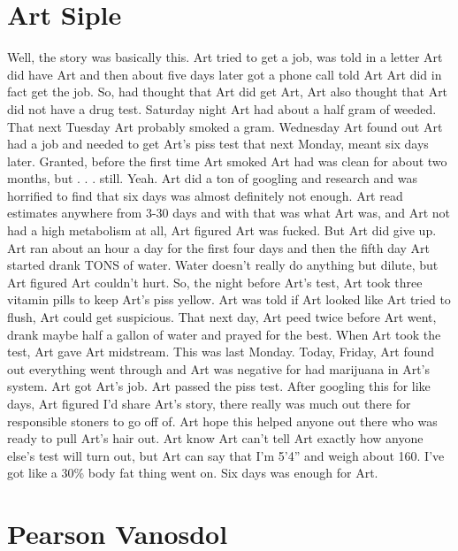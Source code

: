\documentclass[12pt]{book}
\begin{document}
\chapter{Art Siple}

Well, the story was basically this. Art tried to get a job, was told in a letter Art did have Art and then about five days later got a phone call told Art Art did in fact get the job. So, had thought that Art did get Art, Art also thought that Art did not have a drug test. Saturday night Art had about a half gram of weeded. That next Tuesday Art probably smoked a gram. Wednesday Art found out Art had a job and needed to get Art's piss test that next Monday, meant six days later. Granted, before the first time Art smoked Art had was clean for about two months, but . . .  still. Yeah. Art did a ton of googling and research and was horrified to find that six days was almost definitely not enough. Art read estimates anywhere from 3-30 days and with that was what Art was, and Art not had a high metabolism at all, Art figured Art was fucked. But Art did give up. Art ran about an hour a day for the first four days and then the fifth day Art started drank TONS of water. Water doesn't really do anything but dilute, but Art figured Art couldn't hurt. So, the night before Art's test, Art took three vitamin pills to keep Art's piss yellow. Art was told if Art looked like Art tried to flush, Art could get suspicious. That next day, Art peed twice before Art went, drank maybe half a gallon of water and prayed for the best. When Art took the test, Art gave Art midstream. This was last Monday. Today, Friday, Art found out everything went through and Art was negative for had marijuana in Art's system. Art got Art's job. Art passed the piss test. After googling this for like days, Art figured I'd share Art's story, there really was much out there for responsible stoners to go off of. Art hope this helped anyone out there who was ready to pull Art's hair out. Art know Art can't tell Art exactly how anyone else's test will turn out, but Art can say that I'm 5'4'' and weigh about 160. I've got like a 30\% body fat thing went on. Six days was enough for Art.






\chapter{Pearson Vanosdol}
\end{document}
